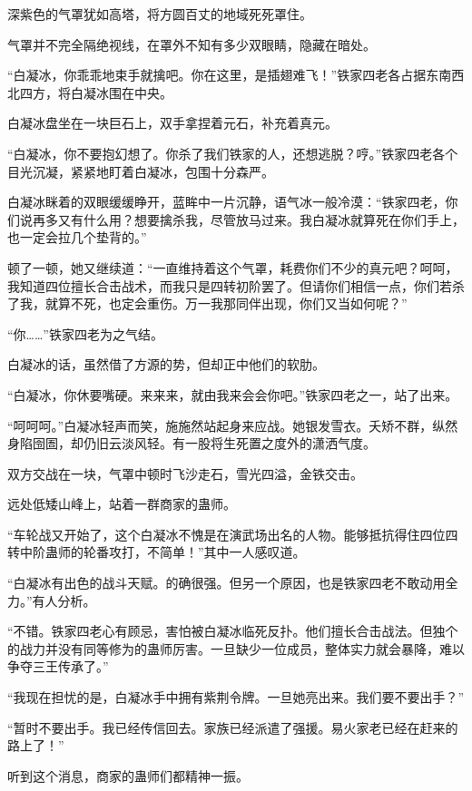
\begin{this_body}

深紫色的气罩犹如高塔，将方圆百丈的地域死死罩住。

气罩并不完全隔绝视线，在罩外不知有多少双眼睛，隐藏在暗处。

“白凝冰，你乖乖地束手就擒吧。你在这里，是插翅难飞！”铁家四老各占据东南西北四方，将白凝冰围在中央。

白凝冰盘坐在一块巨石上，双手拿捏着元石，补充着真元。

“白凝冰，你不要抱幻想了。你杀了我们铁家的人，还想逃脱？哼。”铁家四老各个目光沉凝，紧紧地盯着白凝冰，包围十分森严。

白凝冰眯着的双眼缓缓睁开，蓝眸中一片沉静，语气冰一般冷漠：“铁家四老，你们说再多又有什么用？想要擒杀我，尽管放马过来。我白凝冰就算死在你们手上，也一定会拉几个垫背的。”

顿了一顿，她又继续道：“一直维持着这个气罩，耗费你们不少的真元吧？呵呵，我知道四位擅长合击战术，而我只是四转初阶罢了。但请你们相信一点，你们若杀了我，就算不死，也定会重伤。万一我那同伴出现，你们又当如何呢？”

“你……”铁家四老为之气结。

白凝冰的话，虽然借了方源的势，但却正中他们的软肋。

“白凝冰，你休要嘴硬。来来来，就由我来会会你吧。”铁家四老之一，站了出来。

“呵呵呵。”白凝冰轻声而笑，施施然站起身来应战。她银发雪衣。夭矫不群，纵然身陷囹圄，却仍旧云淡风轻。有一股将生死置之度外的潇洒气度。

双方交战在一块，气罩中顿时飞沙走石，雪光四溢，金铁交击。

远处低矮山峰上，站着一群商家的蛊师。

“车轮战又开始了，这个白凝冰不愧是在演武场出名的人物。能够抵抗得住四位四转中阶蛊师的轮番攻打，不简单！”其中一人感叹道。

“白凝冰有出色的战斗天赋。的确很强。但另一个原因，也是铁家四老不敢动用全力。”有人分析。

“不错。铁家四老心有顾忌，害怕被白凝冰临死反扑。他们擅长合击战法。但独个的战力并没有同等修为的蛊师厉害。一旦缺少一位成员，整体实力就会暴降，难以争夺三王传承了。”

“我现在担忧的是，白凝冰手中拥有紫荆令牌。一旦她亮出来。我们要不要出手？”

“暂时不要出手。我已经传信回去。家族已经派遣了强援。易火家老已经在赶来的路上了！”

听到这个消息，商家的蛊师们都精神一振。


\end{this_body}
